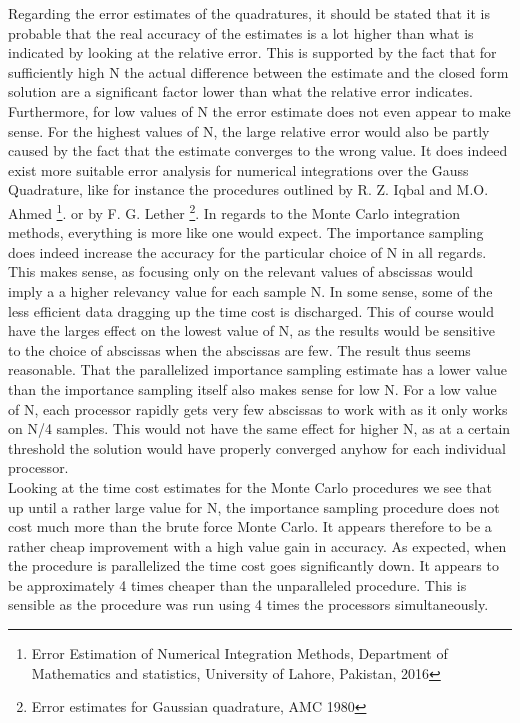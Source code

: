 \documentclass[%
reprint,nofootinbib,
amsmath,amssymb,
aps,
]{revtex4-1}
\begin{document}
Regarding the error estimates of the quadratures, it should be stated that it is probable that the real accuracy  of the estimates is a lot higher than what is indicated by looking at the relative error. This is supported by the fact that for sufficiently high N the actual difference between the estimate and the closed form solution are a significant factor lower than what the relative error indicates. Furthermore, for low values of N the error estimate does not even appear to make sense. For the highest values of N, the large relative error would also be partly caused by the fact that the estimate converges to the wrong value. It does indeed exist more suitable error analysis for numerical integrations over the Gauss Quadrature, like for instance the procedures outlined by R. Z. Iqbal and M.O. Ahmed \footnote{Error Estimation of Numerical Integration Methods, Department of Mathematics and statistics, University of Lahore, Pakistan, 2016}. or by F. G. Lether \footnote{Error estimates for Gaussian quadrature, AMC 1980}.
In regards to the Monte Carlo integration methods, everything is more like one would expect. The importance sampling does indeed increase the accuracy for the particular choice of N in all regards. This makes sense, as focusing only on the relevant values of abscissas would imply a a higher relevancy value for each sample N. In some sense, some of the less efficient data dragging up the time cost is discharged. This of course would have the larges effect on the lowest value of N, as the results would be sensitive to the choice of abscissas when the abscissas are few. The result thus seems reasonable. That the parallelized importance sampling estimate has a lower value than the importance sampling itself also makes sense for low N. For a low value of N, each processor rapidly gets very few abscissas to work with as it only works on N/4 samples. This would not have the same effect for higher N, as at a certain threshold the solution would have properly converged anyhow for each individual processor. \\ \indent 
Looking at the time cost estimates for the Monte Carlo procedures we see that up until a rather large value for N, the importance sampling procedure does not cost much more than the brute force Monte Carlo. It appears therefore to be a rather cheap improvement with a high value gain in accuracy. As expected, when the procedure is parallelized the time cost goes significantly down. It appears to be approximately 4 times cheaper than the unparalleled procedure. This is sensible as the procedure was run using 4 times the processors simultaneously.\\ \indent 
\end{document}
